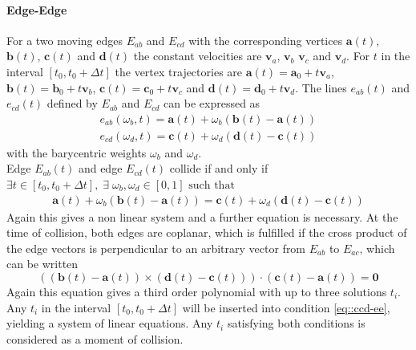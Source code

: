 \paragraph{Edge-Edge}
For a two moving edges $E_{ab}$ and $E_{cd}$ with the corresponding vertices $\mathbf a(t)$, $\mathbf b(t)$, $\mathbf c(t)$ and $\mathbf d(t)$ the constant velocities are $\mathbf v_a$, $\mathbf v_b$ $\mathbf v_c$ and $\mathbf v_d$. For $t$ in the interval $[t_0,t_0+\Delta t]$ the vertex trajectories are $\mathbf a(t)=\mathbf a_0+t\mathbf v_a$, $\mathbf b(t)=\mathbf b_0+t\mathbf v_b$, $\mathbf c(t)=\mathbf c_0+t\mathbf v_c$ and $\mathbf d(t)=\mathbf d_0+t\mathbf v_d$. The lines $e_{ab}(t)$ and $e_{cd}(t)$ defined by $E_{ab}$ and $E_{cd}$ can be expressed as 
\begin{gather}
e_{ab}(\omega_b,t)=\mathbf a(t)+ \omega_b(\mathbf b(t)-\mathbf a(t))\\
e_{cd}(\omega_d,t)=\mathbf c(t)+ \omega_d(\mathbf d(t)-\mathbf c(t))
\end{gather}
with the barycentric weights $\omega_b$ and $\omega_d$.\\ 
 Edge $E_{ab}(t)$ and edge $E_{cd}(t)$ collide if and only if $\exists t \in [t_0,t_0+\Delta t], \; \exists  \; \omega_b, \omega_d \in [0,1] \text{ such that}$
\begin{gather}
\label{eq::ccd-ee}
\mathbf a(t)+ \omega_b(\mathbf b(t)-\mathbf a(t))=\mathbf c(t)+ \omega_d(\mathbf d(t)-\mathbf c(t))
\end{gather}
Again this gives a non linear system and a further equation is necessary. At the time of collision, both edges are coplanar, which is fulfilled if the cross product of the edge vectors is perpendicular to an arbitrary vector from $E_{ab}$ to $E_{ac}$, which can be written
\begin{equation}
((\mathbf{b}(t)-\mathbf{a}(t))\times(\mathbf d(t) -\mathbf c(t)))\cdot(\mathbf c(t)- \mathbf a(t))=\mathbf 0
\end{equation}
Again this equation gives a third order polynomial with up to three solutions $t_i$.
Any $t_i$ in the interval $[t_0,t_0+\Delta t]$ will be inserted into condition \ref{eq::ccd-ee}, yielding a system of linear equations. Any $t_i$ 
satisfying both conditions is considered as a moment of collision.
